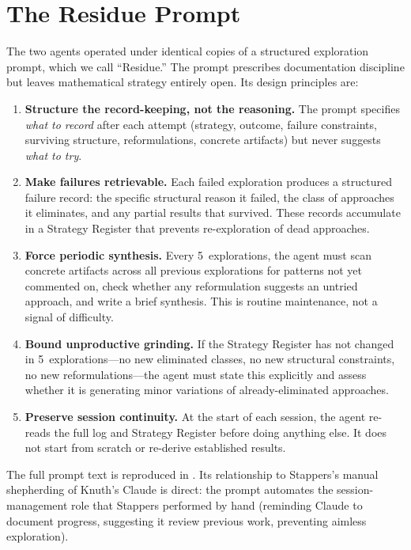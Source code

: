 \documentclass[11pt]{article}
\theoremstyle{definition}
\theoremstyle{remark}
\begin{document}
\section{The Residue Prompt}
\label{sec:prompt}

The two agents operated under identical copies of a structured exploration prompt, which we call ``Residue.'' The prompt prescribes documentation discipline but leaves mathematical strategy entirely open. Its design principles are:

\begin{enumerate}[label=\arabic*.]
    \item \textbf{Structure the record-keeping, not the reasoning.} The prompt specifies \emph{what to record} after each attempt (strategy, outcome, failure constraints, surviving structure, reformulations, concrete artifacts) but never suggests \emph{what to try}.

    \item \textbf{Make failures retrievable.} Each failed exploration produces a structured failure record: the specific structural reason it failed, the class of approaches it eliminates, and any partial results that survived. These records accumulate in a Strategy Register that prevents re-exploration of dead approaches.

    \item \textbf{Force periodic synthesis.} Every 5~explorations, the agent must scan concrete artifacts across all previous explorations for patterns not yet commented on, check whether any reformulation suggests an untried approach, and write a brief synthesis. This is routine maintenance, not a signal of difficulty.

    \item \textbf{Bound unproductive grinding.} If the Strategy Register has not changed in 5~explorations---no new eliminated classes, no new structural constraints, no new reformulations---the agent must state this explicitly and assess whether it is generating minor variations of already-eliminated approaches.

    \item \textbf{Preserve session continuity.} At the start of each session, the agent re-reads the full log and Strategy Register before doing anything else. It does not start from scratch or re-derive established results.
\end{enumerate}

The full prompt text is reproduced in . Its relationship to Stappers's manual shepherding of Knuth's Claude is direct: the prompt automates the session-management role that Stappers performed by hand (reminding Claude to document progress, suggesting it review previous work, preventing aimless exploration).
\end{document}
